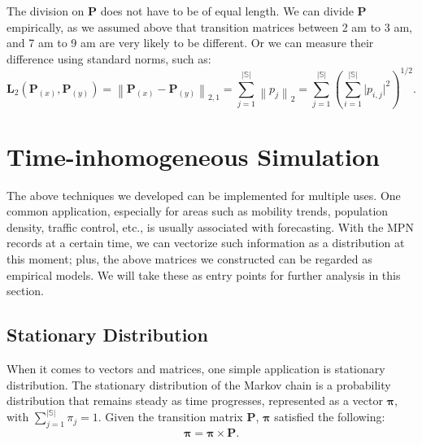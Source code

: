\documentclass[12pt]{article}
\theoremstyle{definition}
\begin{document}
The division on \textbf{P} does not have to be of equal length. We can divide \textbf{P} empirically, as we assumed above that transition matrices between 2 am to 3 am, and 7 am to 9 am are very likely to be different. Or we can measure their difference using standard norms, such as:
\begin{equation*}
    \textbf{L}_{2}(\textbf{P}_{(x)},\textbf{P}_{(y)})={\left\lVert \textbf{P}_{(x)}-\textbf{P}_{(y)}\right\rVert}_{2,1}=\textstyle \sum_{j=1}^{\left| \mathbb{S} \right|} {\left\lVert p_{j}\right\rVert}_{2}=\textstyle \sum_{j=1}^{\left| \mathbb{S} \right|} (\textstyle \sum_{i=1}^{\left| \mathbb{S} \right|}  {\lvert p_{i,j} \rvert}^2)^{1/2}.
\end{equation*}


\newpage








\section{Time-inhomogeneous Simulation}
\label{sec:ti_sim}
The above techniques we developed can be implemented for multiple uses. One common application, especially for areas such as mobility trends, population density, traffic control, etc., is usually associated with forecasting. With the MPN records at a certain time, we can vectorize such information as a distribution at this moment; plus, the above matrices we constructed can be regarded as empirical models. We will take these as entry points for further analysis in this section. 



\subsection{Stationary Distribution}
\label{sec:stationary}
When it comes to vectors and matrices, one simple application is stationary distribution. The stationary distribution of the Markov chain is a probability distribution that remains steady as time progresses, represented as a vector \(\boldsymbol{\pi}\), with \(\textstyle \sum_{j=1}^{\left| \mathbb{S} \right|} {\pi}_{j} =1\). Given the transition matrix \textbf{P}, \(\boldsymbol{\pi}\) satisfied the following:
\begin{equation*}
    \boldsymbol{\pi}=\boldsymbol{\pi} \times \textbf{P}.
\end{equation*}
\end{document}
